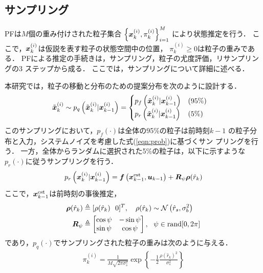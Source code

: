 \documentclass[a4paper,10pt,twocolumn,fleqn]{jsarticle}
\def\vec#1{\mbox{\boldmath$#1$}}
\def\vec#1{\mbox{\boldmath$#1$}}
\begin{document}
\subsection{サンプリング}
\vspace{-2mm}
PFは$M$個の重み付けされた粒子集合
$\left\{\vec{x}^{(i)}_k,\pi_{k}^{(i)}\right\}^{M}_{i=1}$
により状態推定を行う．
ここで，$\vec{x}_{k}^{(i)}$は仮説を表す粒子の状態空間中の位置，
$\pi_{k}^{(i)}\geq 0$は粒子の重みである．
%
PFによる推定の手続きは，サンプリング，粒子の尤度評価，リサンプリングの3
ステップから成る．
ここでは，サンプリングについて詳細に述べる．

本研究では，粒子の移動と分布のための提案分布を次のように設計する．
\begin{align*}
 \tilde{\vec{x}}^{(i)}_k &\sim
p_q\left(\tilde{\vec{x}}^{(i)}_{k} \vert \vec{x}^{(i)}_{k-1}\right)
=
 \begin{cases}
  p_f\left(\tilde{\vec{x}}^{(i)}_{k} \vert \vec{x}^{(i)}_{k-1}\right) 
  & (95 \%)\\
  p_r\left(\tilde{\vec{x}}^{(i)}_{k} \vert \vec{x}^{(i)}_{k-1}\right)
  & (5 \% )
 \end{cases}
\end{align*}
このサンプリングにおいて，$p_f(\cdot)$は全体の95\%の粒子は前時刻$k-1$
の粒子分布と入力，システムノイズを考慮した式(\ref{eqn:prob})に基づくサン
プリングを行う．
%
%
一方，全体からランダムに選択された5\%の粒子は，以下に示すような
$p_r(\cdot)$に従うサンプリングを行う．
\begin{align}
 p_r\left(\vec{x}^{(i)}_{k} \vert \vec{x}^{(i)}_{k-1}\right)
 = \vec{f}\left(\vec{x}^{\text{est}}_{k-1},
  \vec{u}_{k-1}\right)+\vec{R}_\psi\vec{\rho}(\hat{r}_k)
\end{align}
ここで，$\vec{x}^{\text{est}}_{k-1}$は前時刻の事後推定，
\begin{align}
 \vec{\rho}(\hat{r}_k)&\triangleq [\rho(\hat{r}_k)\ \  0]^T,\ \ \ \rho(\hat{r}_k) \sim
 \mathcal{N}\left(\hat{r}_s,\sigma^2_b\right)\\
 \vec{R}_\psi&\triangleq  
 \left[
 \begin{matrix}
  \cos \psi & -\sin \psi \\
  \sin \psi & \cos \psi 
 \end{matrix}
 \right],\ \ \psi\in \text{rand}[0, 2\pi] 
\end{align}
であり，$p_q(\cdot)$でサンプリングされた粒子の重みは次のように与える．
\begin{align}
 \pi^{(i)}_k=\frac{1}{
 M\sqrt{2\pi\sigma_s^2}} \exp
 \left\{-\frac{1}{2}\frac{\rho(\hat{r}_k)^2}{\sigma_s^2}\right\}
\end{align}
\end{document}
